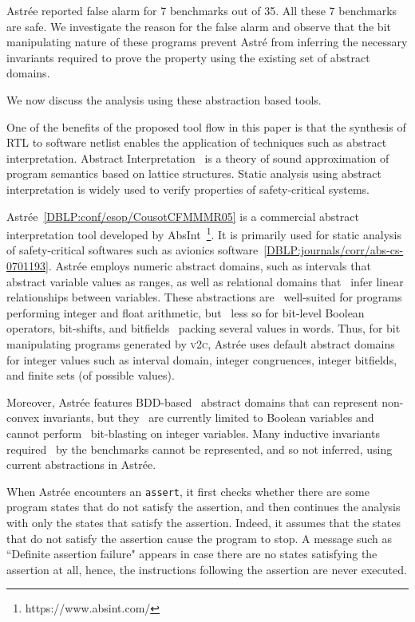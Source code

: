 Astr{\'e}e reported false alarm for 7 benchmarks out of 35. All these 7 benchmarks 
are safe.  We investigate the reason for the false alarm and observe that the 
bit manipulating nature of these programs prevent Astr{\'e} from inferring the 
necessary invariants required to prove the property using the existing set of 
abstract domains.


We now discuss the analysis using these abstraction based tools.

%
One of the benefits of the proposed tool flow in this paper is that the 
synthesis of RTL to software netlist enables the application of techniques 
such as abstract interpretation. Abstract Interpretation~\cite{Cousot92,CC79} is a theory of 
sound approximation of program semantics based on lattice structures. 
Static analysis using abstract interpretation is widely used to verify 
properties of safety-critical systems. 


Astr{\'e}e~\ref{DBLP:conf/esop/CousotCFMMMR05} is a commercial abstract 
interpretation tool developed by AbsInt~\footnote{https://www.absint.com/}.  
It is primarily used for static analysis of safety-critical softwares 
such as avionics software~\ref{DBLP:journals/corr/abs-cs-0701193}.
Astr{\'e}e employs numeric abstract domains, such as intervals that  
abstract variable values as ranges, as well as relational domains that  
infer linear relationships between variables. These abstractions are  
well-suited for programs performing integer and float arithmetic, but  
less so for bit-level Boolean operators, bit-shifts, and bitfields  
packing several values in words. Thus, for bit manipulating programs 
generated by \textsc{v2c}, Astr{\'e}e uses default abstract domains for 
integer values such as interval domain, integer congruences, integer 
bitfields, and finite sets (of possible values).


Moreover, Astr{\'e}e features BDD-based  
abstract domains that can represent non-convex invariants, but they  
are currently limited to Boolean variables and cannot perform  
bit-blasting on integer variables.  Many inductive invariants required  
by the benchmarks cannot be represented, and so not inferred, using 
current abstractions in Astr{\'e}e.

When Astr{\'e}e encounters an \texttt{assert}, it first checks whether 
there are some program states that do not satisfy the assertion, and 
then continues the analysis with only the states that satisfy the assertion. 
Indeed, it assumes that the states that do not satisfy the assertion cause 
the program to stop.  A message such as ``Definite assertion failure" appears 
in case there are no states satisfying the assertion at all, hence, the 
instructions following the assertion are never executed.


